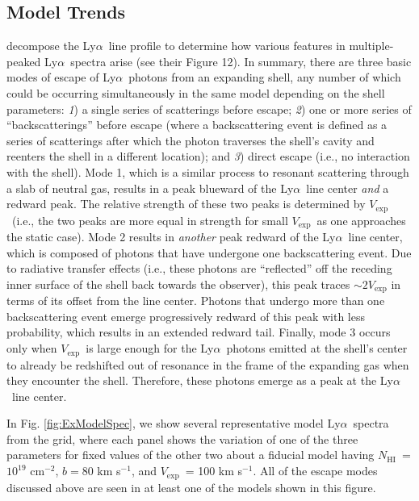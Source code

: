 \documentclass{emulateapj}
\newcommand{\lya}{Ly$\alpha$}
\def\nh{$N_{\mathrm{HI}}$}
\def\vexp{$V_{\mathrm{exp}}$}
\begin{document}
\subsection{Model Trends}\label{subsec:GridTrends}
\citet{verhamme2006} decompose the \lya\ line profile to determine how various features in multiple-peaked \lya\ spectra arise (see their Figure 12). In summary, there are three basic modes of escape of \lya\ photons from an expanding shell, any number of which could be occurring simultaneously in the same model depending on the shell parameters: \textit{1}) a single series of scatterings before escape; \textit{2}) one or more series of ``backscatterings'' before escape (where a backscattering event is defined as a series of scatterings after which the photon traverses the shell's cavity and reenters the shell in a different location); and \textit{3}) direct escape (i.e., no interaction with the shell). Mode 1, which is a similar process to resonant scattering through a slab of neutral gas, results in a peak blueward of the \lya\ line center \textit{and} a redward peak. The relative strength of these two peaks is determined by \vexp\ (i.e., the two peaks are more equal in strength for small \vexp\ as one approaches the static case). Mode 2 results in \textit{another} peak redward of the \lya\ line center, which is composed of photons that have undergone one backscattering event. Due to radiative transfer effects (i.e., these photons are ``reflected'' off the receding inner surface of the shell back towards the observer), this peak traces $\sim2V_{\mathrm{exp}}$ in terms of its offset from the line center. Photons that undergo more than one backscattering event emerge progressively redward of this peak with less probability, which results in an extended redward tail. Finally, mode 3 occurs only when \vexp\ is large enough for the \lya\ photons emitted at the shell's center to already be redshifted out of resonance in the frame of the expanding gas when they encounter the shell. Therefore, these photons emerge as a peak at the \lya\ line center.

In Fig. \ref{fig:ExModelSpec}, we show several representative model \lya\ spectra from the grid, where each panel shows the variation of one of the three parameters for fixed values of the other two about a fiducial model having \nh\ = $10^{19}$ cm$^{-2}$, $b = 80$ km s$^{-1}$, and \vexp\ = 100 km s$^{-1}$. All of the escape modes discussed above are seen in at least one of the models shown in this figure.  
\end{document}

